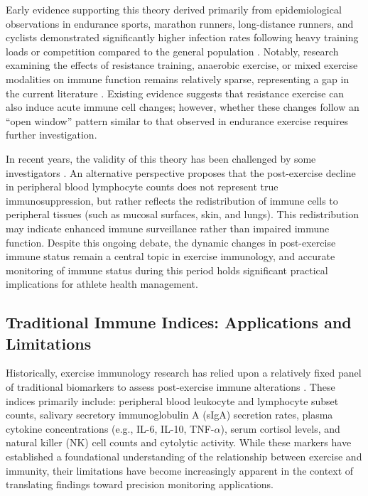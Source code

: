 \documentclass[12pt,a4paper]{article}
\newcommand{\openwindow}{``open window''}
\begin{document}
Early evidence supporting this theory derived primarily from epidemiological observations in endurance sports, marathon runners, long-distance runners, and cyclists demonstrated significantly higher infection rates following heavy training loads or competition compared to the general population \citep{peters1983ultramarathon,nieman1994exercise}. Notably, research examining the effects of resistance training, anaerobic exercise, or mixed exercise modalities on immune function remains relatively sparse, representing a gap in the current literature \citep{nieman2019compelling}. Existing evidence suggests that resistance exercise can also induce acute immune cell changes; however, whether these changes follow an \openwindow{} pattern similar to that observed in endurance exercise requires further investigation.

In recent years, the validity of this theory has been challenged by some investigators \citep{campbell2018debunking}. An alternative perspective proposes that the post-exercise decline in peripheral blood lymphocyte counts does not represent true immunosuppression, but rather reflects the redistribution of immune cells to peripheral tissues (such as mucosal surfaces, skin, and lungs). This redistribution may indicate enhanced immune surveillance rather than impaired immune function. Despite this ongoing debate, the dynamic changes in post-exercise immune status remain a central topic in exercise immunology, and accurate monitoring of immune status during this period holds significant practical implications for athlete health management.

\subsection{Traditional Immune Indices: Applications and Limitations}

Historically, exercise immunology research has relied upon a relatively fixed panel of traditional biomarkers to assess post-exercise immune alterations \citep{gleeson2007immune,nieman2019compelling}. These indices primarily include: peripheral blood leukocyte and lymphocyte subset counts, salivary secretory immunoglobulin A (sIgA) secretion rates, plasma cytokine concentrations (e.g., IL-6, IL-10, TNF-$\alpha$), serum cortisol levels, and natural killer (NK) cell counts and cytolytic activity. While these markers have established a foundational understanding of the relationship between exercise and immunity, their limitations have become increasingly apparent in the context of translating findings toward precision monitoring applications.
\end{document}
